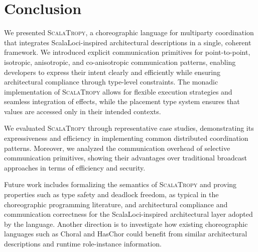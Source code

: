 \documentclass[runningheads]{llncs}
\newcommand{\ourLang}{\textsc{ScalaTropy}}
\newcommand{\diff}[1]{{#1}}
\begin{document}
\section{Conclusion}\label{sec:conclusion}
We presented \ourLang{},
\diff{a choreographic} language for multiparty coordination that \diff{integrates ScalaLoci-inspired architectural descriptions} in a single,
coherent framework.
%
We introduced explicit communication primitives for point-to-point, isotropic, anisotropic, and co-anisotropic communication patterns,
enabling developers to express their intent clearly and efficiently while ensuring architectural compliance through type-level constraints.
%
The monadic implementation of \ourLang{} allows for flexible execution strategies and seamless integration of effects,
while the placement type system ensures that values are accessed only in their intended contexts.

We evaluated \ourLang{} through representative case studies, demonstrating its expressiveness and efficiency in implementing common distributed coordination patterns.
%
Moreover,
we analyzed the communication overhead of selective communication primitives, showing their advantages over traditional broadcast approaches in terms of efficiency and security.

Future work includes formalizing the semantics of \ourLang{} and proving properties such as type safety and deadlock freedom,
as typical in the choreographic programming literature,
and architectural compliance and communication correctness for the ScalaLoci-inspired architectural layer adopted by the language.
\diff{Another direction is to investigate how existing choreographic languages such as Choral and HasChor could benefit from similar architectural descriptions and runtime role-instance information.}

%
%
%
\nocite{*}


%


\end{document}
